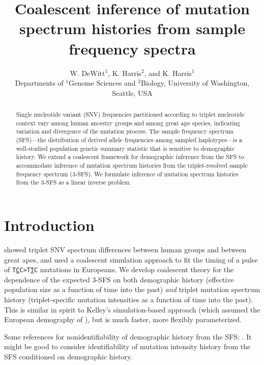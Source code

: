 \documentclass[11pt]{article}
\title{Coalescent inference of mutation spectrum histories from sample frequency spectra}
\author{
W. DeWitt$^{1}$, K. Harris$^{2}$, and K. Harris$^{1}$\\
\small{Departments of $^1$Genome Sciences and $^2$Biology, University of Washington, Seattle, USA}
}
\begin{document}
\maketitle

\begin{abstract}

Single nucleotide variant (SNV) frequencies partitioned according to triplet nucleotide context vary among human ancestry groups and among great ape species, indicating variation and divergence of the mutation process.
The sample frequency spectrum (SFS)---the distribution of derived allele frequencies among sampled haplotypes---is a well-studied population genetic summary statistic that is sensitive to demographic history.
We extend a coalescent framework for demographic inference from the SFS to accommodate inference of mutation spectrum histories from the triplet-resolved sample frequency spectrum (3-SFS).
We formulate inference of mutation spectrum histories from the 3-SFS as a linear inverse problem.

\end{abstract}


\section*{Introduction}\label{sec:intro}

\cite{Harris2017-fw} showed triplet SNV spectrum differences between human groups and between great apes, and used a coalescent simulation approach to fit the timing of a pulse of \texttt{T\underline{C}C>T\underline{T}C} mutations in Europeans.
We develop coalescent theory for the dependence of the expected 3-SFS on both demographic history (effective population size as a function of time into the past) \emph{and} triplet mutation spectrum history (triplet-specific mutation intensities as a function of time into the past).
This is similar in spirit to Kelley's simulation-based approach (which assumed the European demography of \cite{Tennessen2012-dq}), but is much faster, more flexibly parameterized.

Some references for nonidentifiability of demographic history from the SFS: \cite{Baharian2018-np, Bhaskar2014-fu, Terhorst2015-xt, Myers2008-jp}.
It might be good to consider identifiability of mutation intensity history from the SFS conditioned on demographic history.

\end{document}
